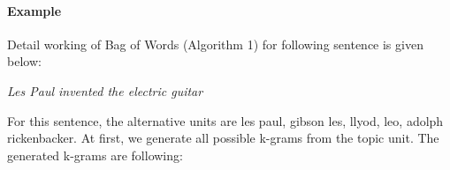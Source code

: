 \documentclass[12pt]{article}
\begin{document}
%

\paragraph{Example}
Detail working of Bag of Words (Algorithm 1) for following sentence is given below:

\emph{Les Paul invented the electric guitar}

For this sentence, the alternative units are les paul, gibson les, llyod, leo, adolph rickenbacker. At first, we generate all possible k-grams from the topic unit. The generated k-grams are following:
\end{document}
